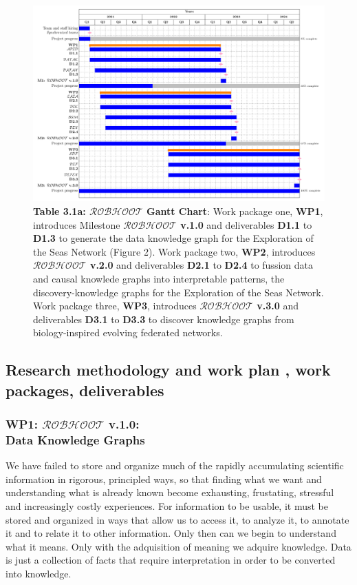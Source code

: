 \documentclass[11pt, a4paper]{article} %
\begin{document}
{\begin{figure}[h!]
   \includegraphics[width=1\textwidth]{Figures/GanttChart.pdf}
   \caption*{{\small {\bf Table 3.1a: $\mathcal{ROBHOOT}$ Gantt
         Chart}: Work package one, {\bf WP1}, introduces Milestone
       {\bf $\mathcal{ROBHOOT}$ v.1.0} and deliverables {\bf D1.1} to
       {\bf D1.3} to generate the data knowledge graph for the
       Exploration of the Seas Network (Figure 2). Work package two,
       {\bf WP2}, introduces {\bf $\mathcal{ROBHOOT}$ v.2.0} and
       deliverables {\bf D2.1} to {\bf D2.4} to fussion data and
       causal knowlede graphs into interpretable patterns, the
       discovery-knowledge graphs for the Exploration of the Seas
       Network. Work package three, {\bf WP3}, introduces {\bf
         $\mathcal{ROBHOOT}$ v.3.0} and deliverables {\bf D3.1} to
       {\bf D3.3} to discover knowledge graphs from biology-inspired
       evolving federated networks.}}
\end{figure}

  
\subsection{Research methodology and work plan , work packages,
  deliverables}

\subsubsection{{\bf WP1: $\mathcal{ROBHOOT}$ v.1.0}: \\ Data Knowledge
  Graphs}
We have failed to store and organize much of the rapidly accumulating scientific information in rigorous, principled ways, so that finding what we want and understanding what is already known become exhausting, frustating, stressful and increasingly costly experiences. For information to be usable, it must be stored and organized in ways that allow us to access it, to analyze it, to annotate it and to relate it to other information. Only then can we begin to understand what it means. Only with the adquisition of meaning we adquire knowledge. Data is just a collection of facts that require interpretation in order to be converted into knowledge. 

}
\end{document}

